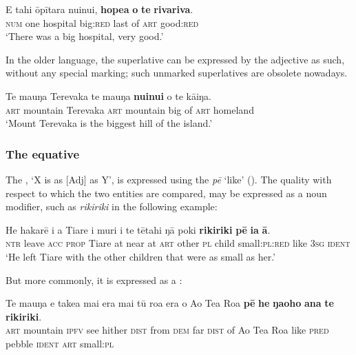 \ea\label{ex:3.121}
\gll E tahi {\ꞌ}ōpītara nuinui, \textbf{hope{\ꞌ}a} \textbf{o} \textbf{te} \textbf{rivariva}. \\
\textsc{num} one hospital big:\textsc{red} last of \textsc{art} good:\textsc{red} \\

\glt 
‘There was a big hospital, very good.’ \textstyleExampleref{[R239.055]} 
\z

In the older language, the superlative can be expressed by the adjective as such, without any special marking; such unmarked superlatives are obsolete nowadays.

\ea\label{ex:3.122}
\gll Te ma{\ꞌ}uŋa Terevaka te ma{\ꞌ}uŋa \textbf{nuinui} o te kāiŋa. \\
\textsc{art} mountain Terevaka \textsc{art} mountain big of \textsc{art} homeland \\

\glt 
‘Mount Terevaka is the biggest hill of the island.’ 
\z

\subsubsection[The \isi{equative}]{The equative}\label{sec:3.5.2.3}

The , ‘X is as [Adj] as Y’, is expressed using the  \textit{pē} ‘like’ (). The quality with respect to which the two entities are compared, may be expressed as a noun modifier, such as \textit{rikiriki} in the following example:

\ea\label{ex:3.123}
\gll He hakarē i a Tiare {\ꞌ}i muri i te tētahi ŋā poki \textbf{rikiriki} \textbf{pē} \textbf{ia} \textbf{{\ꞌ}ā}. \\
\textsc{ntr} leave \textsc{acc} \textsc{prop} Tiare at near at \textsc{art} other \textsc{pl} child small:\textsc{pl}:\textsc{red} like \textsc{3sg} \textsc{ident} \\

\glt
‘He left Tiare with the other children that were as small as her.’ \textstyleExampleref{[R481.034]} 
\z

But more commonly, it is expressed as a :

\ea\label{ex:3.124}
\gll Te ma{\ꞌ}uŋa e take{\ꞌ}a mai era mai tū roa era o Ao Tea Roa  \textbf{pē} \textbf{he} \textbf{ŋa{\ꞌ}oho} \textbf{{\ꞌ}ana} \textbf{te} \textbf{rikiriki}.\\
\textsc{art} mountain \textsc{ipfv} see hither \textsc{dist} from \textsc{dem} far \textsc{dist} of Ao Tea Roa  like \textsc{pred} pebble \textsc{ident} \textsc{art} small:\textsc{pl}\\

